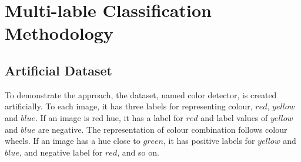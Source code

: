 
\chapter{Multi-lable Classification Methodology} %
\label{Chapter6}

\section{Artificial Dataset}

To demonstrate the approach, the dataset, named color detector, is created artificially. To each image, it has three labels for representing colour, $red$, $yellow$ and $blue$. If an image is red hue, it has a label for $red$ and label values of $yellow$ and $blue$ are negative. The representation of colour combination follows colour wheels. If an image has a hue close to $green$, it has positive labels for $yellow$ and $blue$, and negative label for $red$, and so on.



















